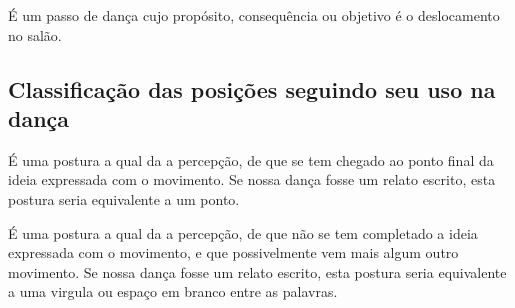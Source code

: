 \begin{definition} 
\label{def:PassoDeDeslocamento} 
É um passo de dança cujo propósito, consequência ou objetivo é o deslocamento no salão.
\end{definition}

\subsection{Classificação das posições seguindo seu uso na dança}

\begin{definition} 
\label{def:PosturaFinaliza}
É uma postura a qual da a percepção, 
de que se tem chegado ao ponto final da ideia expressada com o movimento.
Se nossa dança fosse um relato escrito, esta postura seria equivalente a um ponto.
\end{definition}

\begin{definition} 
\label{def:PosturaTransicao}
É uma postura a qual da a percepção, 
de que não se tem completado a ideia expressada com o movimento, e que possivelmente vem mais algum outro movimento.
Se nossa dança fosse um relato escrito, esta postura seria equivalente a uma virgula ou espaço em branco entre as palavras.
\end{definition}

